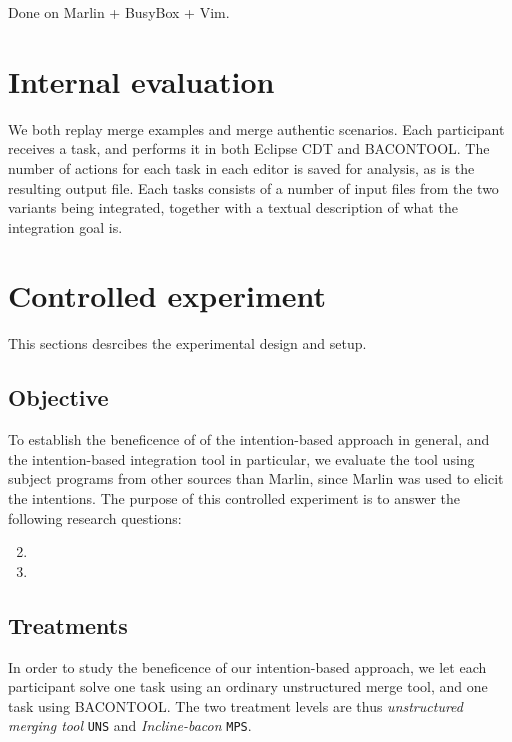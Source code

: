 Done on Marlin + BusyBox + Vim.

\section{Internal evaluation}
We both replay merge examples and merge authentic scenarios. Each participant receives a task, and performs it in both Eclipse CDT and BACONTOOL. The number of actions for each task in each editor is saved for analysis, as is the resulting output file. Each tasks consists of a number of input files from the two variants being integrated, together with a textual description of what the integration goal is.

\section{Controlled experiment}
This sections desrcibes the experimental design and setup.

\subsection{Objective}
To establish the beneficence of of the intention-based approach in general, and the intention-based integration tool in particular, we evaluate the tool using subject programs from other sources than Marlin, since Marlin was used to elicit the intentions. The purpose of this controlled experiment is to answer the following research questions:
\begin{enumerate}[label={Q\arabic*}]
    \setcounter{enumi}{1}
    \item \RQB
    \item \RQC
\end{enumerate}

\subsection{Treatments}
In order to study the beneficence of our intention-based approach, we let each participant solve one task using an ordinary unstructured merge tool, and one task using BACONTOOL. The two treatment levels are thus \textit{unstructured merging tool} \texttt{UNS} and \textit{Incline-bacon} \texttt{MPS}.

